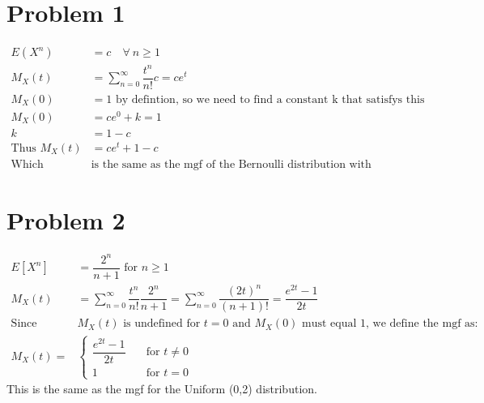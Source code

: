 \documentclass{article}
\begin{document}
\begin{flushleft}
\section*{Problem 1}
\begin{align*}
E(X^n)&=c \quad \forall \ n\geq 1\\
M_X(t)&=\sum_{n=0}^{\infty}\dfrac{t^n}{n!}c=ce^{t}\\
M_X(0)&=1\text{ by defintion, so we need to find a constant k that satisfys this equation}\\
M_X(0)&=ce^{0}+k=1\\
k&=1-c\\
\text{Thus } M_X(t)&=ce^{t}+1-c\\
\text{Which }& \text{is the same as the mgf of the Bernoulli distribution with parameter c}
\end{align*}
\section*{Problem 2}

\begin{align*}
E[X^n]&=\dfrac{2^n}{n+1}  \text{ for } n \geq 1\\
M_X(t)&=\sum_{n=0}^{\infty}\dfrac{t^n}{n!}\dfrac{2^n}{n+1}=\sum_{n=0}^{\infty}\dfrac{(2t)^n}{(n+1)!}=\dfrac{e^{2t}-1}{2t}\\
\text{Since }& M_X(t) \text{ is undefined for } t=0 \text{ and } M_X(0) \text{ must equal 1, we define the mgf as:}\\ 
M_X(t)=& 
\begin{cases}
\dfrac{e^{2t}-1}{2t} \quad &\text{for } t \neq 0\\
1 \quad &\text{for } t=0 
\end{cases}
\end{align*}
This is the same as the mgf for the Uniform (0,2) distribution.

\end{flushleft}
\end{document}
